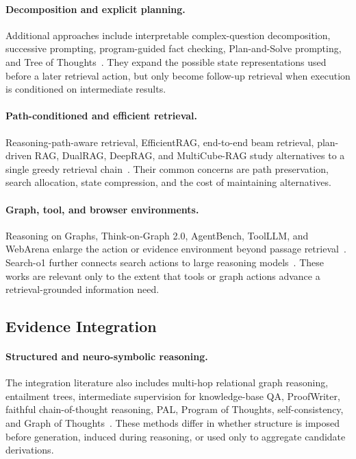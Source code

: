 \paragraph{Decomposition and explicit planning.}
Additional approaches include interpretable complex-question decomposition, successive prompting, program-guided fact checking, Plan-and-Solve prompting, and Tree of Thoughts~\cite{extFR017,extFR022,extFR026,extFR030,extFR033}. They expand the possible state representations used before a later retrieval action, but only become follow-up retrieval when execution is conditioned on intermediate results.

\paragraph{Path-conditioned and efficient retrieval.}
Reasoning-path-aware retrieval, EfficientRAG, end-to-end beam retrieval, plan-driven RAG, DualRAG, DeepRAG, and MultiCube-RAG study alternatives to a single greedy retrieval chain~\cite{extFR032,extFR039,extFR040,extFR055,extFR059,extFR071,extFR075}. Their common concerns are path preservation, search allocation, state compression, and the cost of maintaining alternatives.

\paragraph{Graph, tool, and browser environments.}
Reasoning on Graphs, Think-on-Graph 2.0, AgentBench, ToolLLM, and WebArena enlarge the action or evidence environment beyond passage retrieval~\cite{extFR046,extFR065,extFR036,extFR049,extFR050}. Search-o1 further connects search actions to large reasoning models~\cite{extFR064}. These works are relevant only to the extent that tools or graph actions advance a retrieval-grounded information need.

\subsection{Evidence Integration}
\paragraph{Structured and neuro-symbolic reasoning.}
The integration literature also includes multi-hop relational graph reasoning, entailment trees, intermediate supervision for knowledge-base QA, ProofWriter, faithful chain-of-thought reasoning, PAL, Program of Thoughts, self-consistency, and Graph of Thoughts~\cite{extEO008,extEO010,extEO011,extEO015,extEO031,extEO035,extEO037,extEO040,extEO051}. These methods differ in whether structure is imposed before generation, induced during reasoning, or used only to aggregate candidate derivations.

